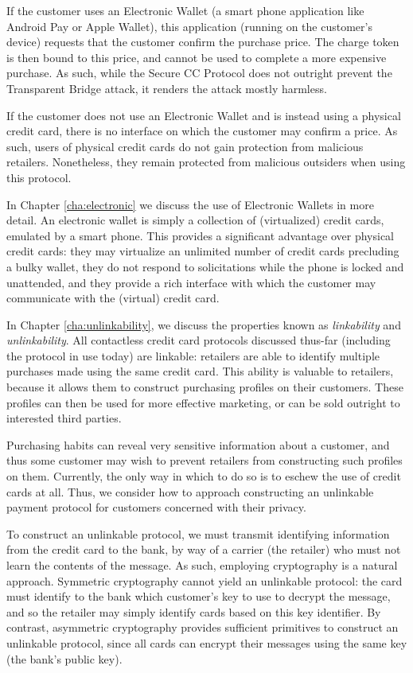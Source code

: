 If the customer uses an Electronic Wallet (a smart phone application like Android Pay or Apple Wallet),
    this application (running on the customer's device) requests that the customer confirm the purchase price.
The charge token is then bound to this price, and cannot be used to complete a more expensive purchase.
As such, while the Secure CC Protocol does not outright prevent the Transparent Bridge attack, it renders the attack mostly harmless.

If the customer does not use an Electronic Wallet and is instead using a physical credit card,
    there is no interface on which the customer may confirm a price.
As such, users of physical credit cards do not gain protection from malicious retailers.
Nonetheless, they remain protected from malicious outsiders when using this protocol.


In Chapter \ref{cha:electronic} we discuss the use of Electronic Wallets in more detail.
An electronic wallet is simply a collection of (virtualized) credit cards, emulated by a smart phone.
This provides a significant advantage over physical credit cards:
    they may virtualize an unlimited number of credit cards precluding a bulky wallet,
    they do not respond to solicitations while the phone is locked and unattended,
    and they provide a rich interface with which the customer may communicate with the (virtual) credit card.


In Chapter \ref{cha:unlinkability}, we discuss the properties known as \emph{linkability} and \emph{unlinkability}.
All contactless credit card protocols discussed thus-far (including the protocol in use today) are linkable:
    retailers are able to identify multiple purchases made using the same credit card.
This ability is valuable to retailers, because it allows them to construct purchasing profiles on their customers.
These profiles can then be used for more effective marketing, or can be sold outright to interested third parties.

Purchasing habits can reveal very sensitive information about a customer,
    and thus some customer may wish to prevent retailers from constructing such profiles on them.
Currently, the only way in which to do so is to eschew the use of credit cards at all.
Thus, we consider how to approach constructing an unlinkable payment protocol for customers concerned with their privacy.

To construct an unlinkable protocol, we must transmit identifying information from the credit card to the bank,
    by way of a carrier (the retailer) who must not learn the contents of the message.
As such, employing cryptography is a natural approach.
Symmetric cryptography cannot yield an unlinkable protocol:
    the card must identify to the bank which customer's key to use to decrypt the message, and so the retailer may simply identify cards based on this key identifier.
By contrast, asymmetric cryptography provides sufficient primitives to construct an unlinkable protocol, since all cards can encrypt their messages using the same key (the bank's public key).

